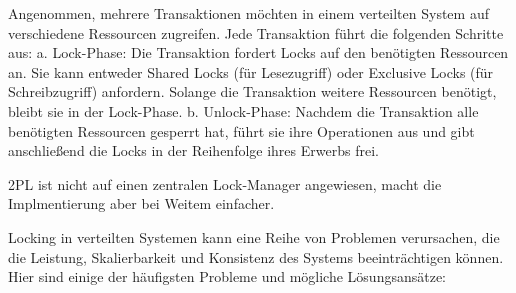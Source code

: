 Angenommen, mehrere Transaktionen möchten in einem verteilten System auf verschiedene Ressourcen zugreifen. Jede Transaktion führt die folgenden Schritte aus:
a. Lock-Phase: Die Transaktion fordert Locks auf den benötigten Ressourcen an. Sie kann entweder Shared Locks (für Lesezugriff) oder Exclusive Locks (für Schreibzugriff) anfordern. Solange die Transaktion weitere Ressourcen benötigt, bleibt sie in der Lock-Phase.
b. Unlock-Phase: Nachdem die Transaktion alle benötigten Ressourcen gesperrt hat, führt sie ihre Operationen aus und gibt anschließend die Locks in der Reihenfolge ihres Erwerbs frei.

2PL ist nicht auf einen  zentralen Lock-Manager angewiesen, macht die Implmentierung aber bei Weitem einfacher. 

Locking in verteilten Systemen kann eine Reihe von Problemen verursachen, die die Leistung, Skalierbarkeit und Konsistenz des Systems beeinträchtigen können. Hier sind einige der häufigsten Probleme und mögliche Lösungsansätze:
